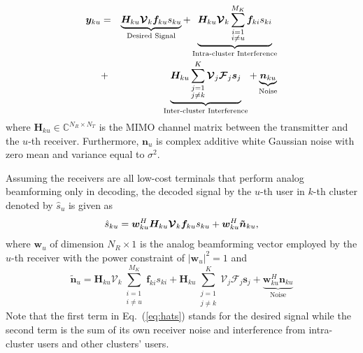 \documentclass[conference]{IEEEtran}
\begin{document}
\begin{eqnarray}{\label{eq:rewrite}}
{\bm y}_{ku} &=&\underbrace{\bm{H}_{ku} \bm{\mathcal{V}}_k\bm{f}_{ku}{s}_{ku}}_\text{Desired Signal}+\underbrace{\bm{H}_{ku} \bm{\mathcal{V}}_k\sum_{\substack{i=1 \\ i\neq u}}^{M_K}\bm{f}_{ki}s_{ki}}_\text{Intra-cluster Interference} \nonumber\\
&+& \underbrace{\bm{H}_{ku}\sum_{\substack{j=1\\j\neq k}}^{K}\bm{\mathcal{V}}_j\bm{\mathcal{F}}_j\bm{s}_j}_\text{Inter-cluster Interference}+ \underbrace{\bm{n}_{ku}}_\text{Noise}
\end{eqnarray}
where $\bm{H}_{ku}$$\in\mathbb{C}^{N_R\times N_T}$ is the MIMO channel matrix between the transmitter and the $u$-th receiver\cite{el2014spatially}. Furthermore, $\bm{n}_u$ is complex additive white Gaussian noise with zero mean and variance equal to $\sigma^2$.

Assuming the receivers are all low-cost terminals that perform analog beamforming only in decoding, the decoded signal by the $u$-th user in $k$-th cluster denoted by $\hat{s}_u$ is given as
\begin{equation}{\label{eq:hats}}
\hat{s}_{ku} = \bm{w}_{ku}^H \bm{H}_{ku} \bm{\mathcal{V}}_k \bm{f}_{ku} s_{ku} + \bm{w}_{ku}^H \bm{\tilde{n}}_{ku},
\end{equation}
where ${\bm w}_u$ of dimension $N_R\times 1$ is the analog beamforming vector employed by the $u$-th receiver with the power constraint of $|\bm{w}_u|^2=1$ and
\begin{equation}\label{Eq:ntilde}
\bm{\tilde{n}}_u=\bm{H}_{ku} \bm{\mathcal{V}}_k\sum_{\substack{i=1 \\ i\neq u}}^{M_K}\bm{f}_{ki}s_{ki} + \bm{H}_{ku}\sum_{\substack{j=1\\j\neq k}}^{K}\bm{\mathcal{V}}_j\bm{\mathcal{F}}_j\bm{s}_j+  \underbrace{\bm{w}_{ku}^H \bm{n}_{ku}}_\text{Noise}
\end{equation}
Note that the first term in Eq.~(\ref{eq:hats}) stands for the desired signal while the second term is the sum of its own receiver noise and interference from intra-cluster users and other clusters' users.
\end{document}
